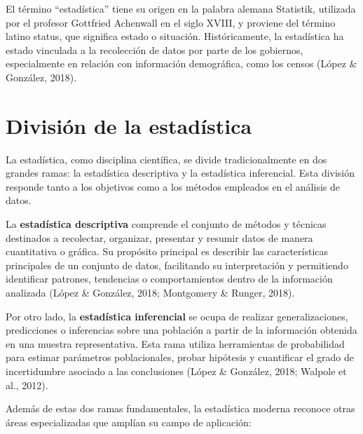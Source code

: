 \documentclass[
  spanish,
  letterpaper,
]{book}
\begin{document}
El término ``estadística'' tiene su origen en la palabra alemana
Statistik, utilizada por el profesor Gottfried Achenwall en el siglo
XVIII, y proviene del término latino status, que significa estado o
situación. Históricamente, la estadística ha estado vinculada a la
recolección de datos por parte de los gobiernos, especialmente en
relación con información demográfica, como los censos (López \&
González, 2018).

\section{División de la
estadística}\label{divisiuxf3n-de-la-estaduxedstica}

La estadística, como disciplina científica, se divide tradicionalmente
en dos grandes ramas: la estadística descriptiva y la estadística
inferencial. Esta división responde tanto a los objetivos como a los
métodos empleados en el análisis de datos.

La \textbf{estadística descriptiva} comprende el conjunto de métodos y
técnicas destinados a recolectar, organizar, presentar y resumir datos
de manera cuantitativa o gráfica. Su propósito principal es describir
las características principales de un conjunto de datos, facilitando su
interpretación y permitiendo identificar patrones, tendencias o
comportamientos dentro de la información analizada (López \& González,
2018; Montgomery \& Runger, 2018).

Por otro lado, la \textbf{estadística inferencial} se ocupa de realizar
generalizaciones, predicciones o inferencias sobre una población a
partir de la información obtenida en una muestra representativa. Esta
rama utiliza herramientas de probabilidad para estimar parámetros
poblacionales, probar hipótesis y cuantificar el grado de incertidumbre
asociado a las conclusiones (López \& González, 2018; Walpole et al.,
2012).

Además de estas dos ramas fundamentales, la estadística moderna reconoce
otras áreas especializadas que amplían su campo de aplicación:
\end{document}
